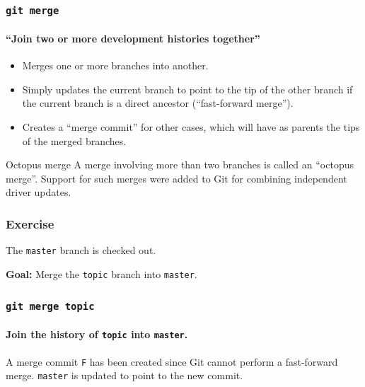 \documentclass{beamer}
\newcommand\gitcmd[1]{\texttt{git #1}}
\newcommand\grefspec[1]{\texttt{#1}}
\newcommand\gbranch[1]{\texttt{#1}}
\newcommand\goal[1]{\textbf{Goal:} #1}
\begin{document}
\begin{frame}
  \frametitle{\gitcmd{merge}}
  \framesubtitle{``Join two or more development histories together''}
  \begin{itemize}
    \item Merges one or more branches into another.
    \item Simply updates the current branch to point to the tip of the other branch if the current branch is a direct ancestor (``fast-forward merge'').
    \item Creates a ``merge commit'' for other cases, which will have as parents the tips of the merged branches.
  \end{itemize}
  \begin{block}{Octopus merge}
    A merge involving more than two branches is called an ``octopus merge''.
    Support for such merges were added to Git for combining independent driver updates.
  \end{block}
\end{frame}

\begin{frame}
  \frametitle{Exercise}

  The \gbranch{master} branch is checked out.

  \goal{Merge the \gbranch{topic} branch into \gbranch{master}.}
  
  \begin{figure}
    \centering
  \end{figure}
\end{frame}

\begin{frame}
  \frametitle{\gitcmd{merge topic}}
  \framesubtitle{Join the history of \gbranch{topic} into \gbranch{master}.}
  
  \begin{figure}
    \centering
  \end{figure}

  A merge commit \grefspec{F} has been created since Git cannot perform a fast-forward merge. \gbranch{master} is updated to point to the new commit.
\end{frame}
\end{document}

